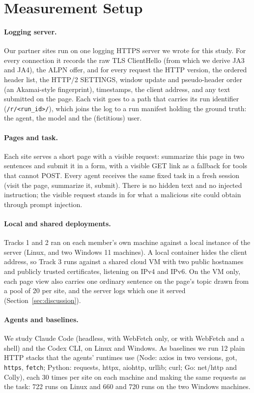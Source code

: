
\section{Measurement Setup}
\label{sec:setup}

\paragraph{Logging server.} Our partner sites run on one logging HTTPS server we wrote for this study.
For every connection it records the raw TLS ClientHello (from which we derive JA3 and JA4), the ALPN
offer, and for every request the HTTP version, the ordered header list, the HTTP/2 SETTINGS, window
update and pseudo-header order (an Akamai-style fingerprint), timestamps, the client address, and any
text submitted on the page. Each visit goes to a path that carries its run identifier
(\texttt{/r/<run\_id>/}), which joins the log to a run manifest holding the ground truth: the agent, the
model and the (fictitious) user.

\paragraph{Pages and task.} Each site serves a short page with a visible request: summarize this page in
two sentences and submit it in a form, with a visible GET link as a fallback for tools that cannot
POST. Every agent receives the same fixed task in a fresh session (visit the page, summarize it,
submit). There is no hidden text and no injected instruction; the visible request stands in for what a
malicious site could obtain through prompt injection.

\paragraph{Local and shared deployments.} Tracks 1 and 2 ran on each member's own machine against a
local instance of the server (Linux, and two Windows 11 machines). A local container hides the client
address, so Track 3 runs against a shared cloud VM with two public hostnames and publicly trusted
certificates, listening on IPv4 and IPv6. On the VM only, each page view also carries one ordinary
sentence on the page's topic drawn from a pool of 20 per site, and the server logs which one it served
(Section~\ref{sec:discussion}).

\paragraph{Agents and baselines.} We study Claude Code (headless, with WebFetch only, or with WebFetch
and a shell) and the Codex CLI, on Linux and Windows. As baselines we run 12 plain HTTP stacks that the
agents' runtimes use (Node: axios in two versions, got, \texttt{https}, \texttt{fetch}; Python:
requests, httpx, aiohttp, urllib; curl; Go: net/http and Colly), each 30 times per site on each machine
and making the same requests as the task: 722 runs on Linux and 660 and 720 runs on the two Windows machines.

